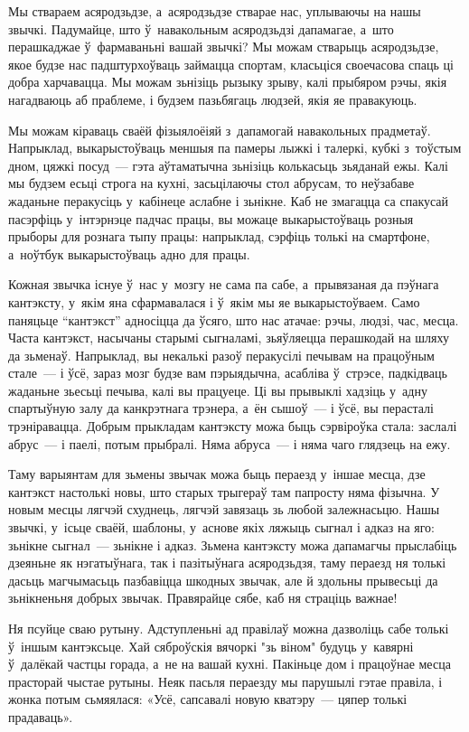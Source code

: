 Мы ствараем асяродзьдзе, а~асяродзьдзе стварае нас, уплываючы на нашы звычкі. Падумайце, што ў~навакольным асяродзьдзі дапамагае, а~што перашкаджае ў~фармаваньні вашай звычкі? Мы можам стварыць асяродзьдзе, якое будзе нас падштурхоўваць займацца спортам, класьціся своечасова спаць ці добра харчавацца. Мы можам зьнізіць рызыку зрыву, калі прыбяром рэчы, якія нагадваюць аб праблеме, і будзем пазьбягаць людзей, якія яе правакуюць.

Мы можам кіраваць сваёй фізыялоёіяй з~дапамогай навакольных прадметаў. Напрыклад, выкарыстоўваць меншыя па памеры лыжкі і талеркі, кубкі з~тоўстым дном, цяжкі посуд~--- гэта аўтаматычна зьнізіць колькасьць зьяданай ежы. Калі мы будзем есьці строга на кухні, засьцілаючы стол абрусам, то неўзабаве жаданьне перакусіць у~кабінеце аслабне і зьнікне. Каб не змагацца са спакусай пасэрфіць у~інтэрнэце падчас працы, вы можаце выкарыстоўваць розныя прыборы для рознага тыпу працы: напрыклад, сэрфіць толькі на смартфоне, а~ноўтбук выкарыстоўваць адно для працы.

Кожная звычка існуе ў~нас у~мозгу не сама па сабе, а~прывязаная да пэўнага кантэксту, у~якім яна сфармавалася і ў~якім мы яе выкарыстоўваем. Само паняцьце “кантэкст” адносіцца да ўсяго, што нас атачае: рэчы, людзі, час, месца. Часта кантэкст, насычаны старымі сыгналамі, зьяўляецца перашкодай на шляху да зьменаў. Напрыклад, вы некалькі разоў перакусілі печывам на працоўным стале~--- і ўсё, зараз мозг будзе вам пэрыядычна, асабліва ў~стрэсе, падкідваць жаданьне зьесьці печыва, калі вы працуеце. Ці вы прывыклі хадзіць у~адну спартыўную залу да канкрэтнага трэнера, а~ён сышоў~--- і ўсё, вы перасталі трэніравацца. Добрым прыкладам кантэксту можа быць сэрвіроўка стала: заслалі абрус~--- і паелі, потым прыбралі. Няма абруса~--- і няма чаго глядзець на ежу. 

Таму варыянтам для зьмены звычак можа быць пераезд у~іншае месца, дзе кантэкст настолькі новы, што старых трыгераў там папросту няма фізычна. У новым месцы лягчэй схуднець, лягчэй завязаць зь любой залежнасьцю. Нашы звычкі, у~ісьце сваёй, шаблоны, у~аснове якіх ляжыць сыгнал і адказ на яго: зьнікне сыгнал~--- зьнікне і адказ. Зьмена кантэксту можа дапамагчы прыслабіць дзеяньне як нэгатыўнага, так і пазітыўнага асяродзьдзя, таму пераезд ня толькі дасьць магчымасьць пазбавіцца шкодных звычак, але й здольны прывесьці да зьнікненьня добрых звычак. Правярайце сябе, каб ня страціць важнае! 

Ня псуйце сваю рутыну. Адступленьні ад правілаў можна дазволіць сабе толькі ў~іншым кантэксьце. Хай сяброўскія вячоркі "зь віном" будуць у~кавярні ў~далёкай частцы горада, а~не на вашай кухні. Пакіньце дом і працоўнае месца прасторай чыстае рутыны. Неяк пасьля пераезду мы парушылі гэтае правіла, і жонка потым сьмяялася: «Усё, сапсавалі новую кватэру~--- цяпер толькі прадаваць».

